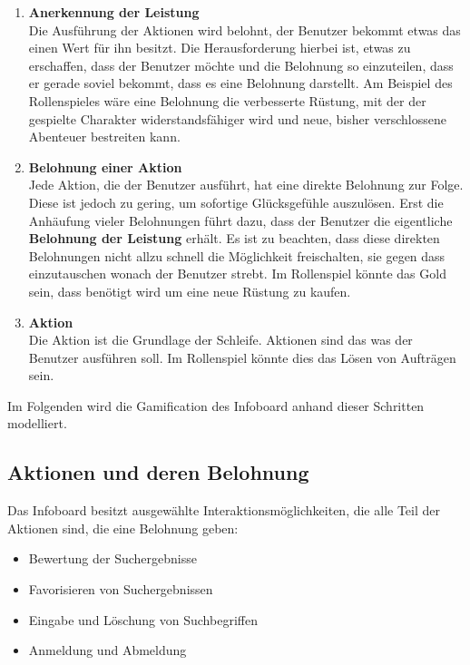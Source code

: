 \documentclass[12pt,twoside]{book}
\begin{document}
\begin{enumerate}
  \item \textbf{Anerkennung der Leistung} \\
  Die Ausführung der Aktionen wird belohnt, der Benutzer bekommt etwas das einen Wert für ihn besitzt. Die Herausforderung hierbei ist, etwas zu erschaffen, dass der Benutzer möchte und die Belohnung so einzuteilen, dass er gerade soviel bekommt, dass es eine Belohnung darstellt. Am Beispiel des Rollenspieles wäre eine Belohnung die verbesserte Rüstung, mit der der gespielte Charakter widerstandsfähiger wird und neue, bisher verschlossene Abenteuer bestreiten kann.
  \item \textbf{Belohnung einer Aktion}\\
  Jede Aktion, die der Benutzer ausführt, hat eine direkte Belohnung zur Folge. Diese ist jedoch zu gering, um sofortige Glücksgefühle auszulösen. Erst die  Anhäufung vieler Belohnungen führt dazu, dass der Benutzer die eigentliche \textbf{Belohnung der Leistung} erhält. Es ist zu beachten, dass diese direkten Belohnungen nicht allzu schnell die Möglichkeit freischalten, sie gegen dass einzutauschen wonach der Benutzer strebt. Im Rollenspiel könnte das Gold sein, dass benötigt wird um eine neue Rüstung zu kaufen.
  \item \textbf{Aktion}\\
  Die Aktion ist die Grundlage der Schleife. Aktionen sind das was der Benutzer ausführen soll. Im Rollenspiel könnte dies das Lösen von Aufträgen sein.
\end{enumerate}

Im Folgenden wird die Gamification des Infoboard anhand dieser Schritten modelliert.

\subsection{Aktionen und deren Belohnung}

Das Infoboard besitzt ausgewählte Interaktionsmöglichkeiten, die alle Teil der Aktionen sind, die eine Belohnung geben:

\begin{itemize}
  \item Bewertung der Suchergebnisse
  \item Favorisieren von Suchergebnissen
  \item Eingabe und Löschung von Suchbegriffen
  \item Anmeldung und Abmeldung
\end{itemize}
\end{document}
